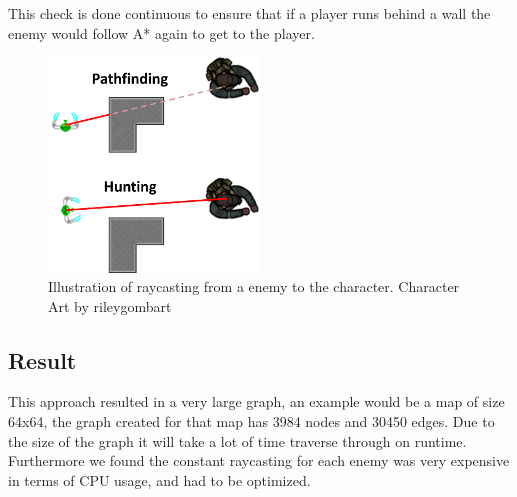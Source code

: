 This check is done continuous to ensure that if a player runs behind a wall the enemy would follow A* again to get to the player.
\begin{figure}[H]
\begin{center}
	\includegraphics[width=0.5\textwidth]{figures/astar/raycast}
	\caption{Illustration of raycasting from a enemy to the character. Character Art by rileygombart\cite{artist}}
	\label{raycast}
\end{center}
\end{figure}

\subsection*{Result}
This approach resulted in a very large graph, an example would be a map of size 64x64, the graph created for that map has 3984 nodes and 30450 edges. Due to the size of the graph it will take a lot of time traverse through on runtime.
Furthermore we found the constant raycasting for each enemy was very expensive in terms of CPU usage, and had to be optimized.